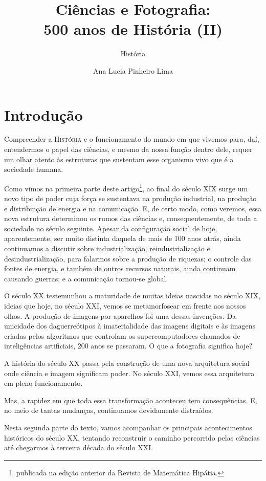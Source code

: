\documentclass{hipatia}
\title{Ciências e Fotografia:\\ 500 anos de História (II)}
\subtitle{História}
\author{Ana Lucia Pinheiro Lima}
\begin{document}
\setcounter{page}{\historiapage}
\maketitle

\section{Introdução}

 Compreender a \textsc{História} e o funcionamento do mundo em que vivemos para, daí, entendermos o papel das ciências, e mesmo da nossa função dentro dele, requer um olhar atento às estruturas que sustentam esse organismo vivo que é a sociedade humana.


Como vimos na primeira parte deste artigo\footnote{publicada na edição anterior da Revista de Matemática Hipátia.}, ao final do século XIX surge um novo tipo de poder cuja força se sustentava na produção industrial, na produção e distribuição de energia e na comunicação. E, de certo modo, como veremos, essa nova estrutura determinou os rumos das ciências e, consequentemente, de toda a sociedade no século seguinte. Apesar da configuração social de hoje, aparentemente, ser muito distinta daquela de mais de 100 anos atrás, ainda continuamos a discutir sobre industrialização, reindustrialização e desindustrialização, para falarmos sobre a produção de riquezas; o controle das fontes de energia, e também de outros recursos naturais, ainda continuam causando guerras; e a comunicação tornou-se global.

O século XX testemunhou a maturidade de muitas ideias nascidas no século XIX, ideias que hoje, no século XXI, vemos se metamorfosear em frente aos nossos olhos. A produção de imagens por aparelhos foi uma dessas invenções. Da unicidade dos daguerreótipos à imaterialidade das imagens digitais e às imagens criadas pelos algoritmos que controlam os supercomputadores chamados de inteligências artificiais, 200 anos se passaram. O que a fotografia significa hoje?

A história do século XX passa pela construção de uma nova arquitetura social onde ciência e imagem significam poder. No século XXI, vemos essa arquitetura em pleno funcionamento.

Mas, a rapidez em que toda essa transformação aconteceu tem consequências. E, no meio de tantas mudanças, continuamos devidamente distraídos.


Nesta segunda parte do texto, vamos acompanhar os principais acontecimentos históricos do século XX, tentando reconstruir o caminho percorrido pelas ciências até chegarmos à terceira década do século XXI.
\end{document}
